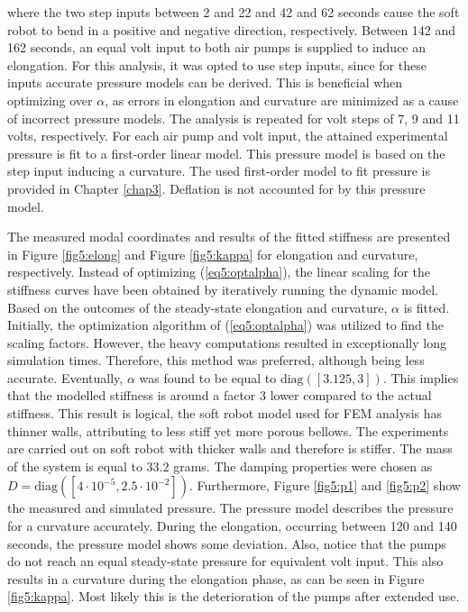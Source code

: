 where the two step inputs between 2 and 22 and 42 and 62 seconds cause the soft robot to bend in a positive and negative direction, respectively. Between 142 and 162 seconds, an equal volt input to both air pumps is supplied to induce an elongation. For this analysis, it was opted to use step inputs, since for these inputs accurate pressure models can be derived. This is beneficial when optimizing over $\alpha$, as errors in elongation and curvature are minimized as a cause of incorrect pressure models. The analysis is repeated for volt steps of 7, 9 and 11 volts, respectively. For each air pump and volt input, the attained experimental pressure is fit to a first-order linear model. This pressure model is based on the step input inducing a curvature. The used first-order model to fit pressure is provided in Chapter \ref{chap3}. Deflation is not accounted for by this pressure model. 

The measured modal coordinates and results of the fitted stiffness are presented in Figure \ref{fig5:elong} and Figure \ref{fig5:kappa} for elongation and curvature, respectively. Instead of optimizing (\ref{eq5:optalpha}), the linear scaling for the stiffness curves have been obtained by iteratively running the dynamic model. Based on the outcomes of the steady-state elongation and curvature, $\alpha$ is fitted. Initially, the optimization algorithm of (\ref{eq5:optalpha}) was utilized to find the scaling factors. However, the heavy computations resulted in exceptionally long simulation times. Therefore, this method was preferred, although being less accurate. Eventually, $\alpha$ was found to be equal to $\text{diag}([3.125,3])$. This implies that the modelled stiffness is around a factor 3 lower compared to the actual stiffness. This result is logical, the soft robot model used for FEM analysis has thinner walls, attributing to less stiff yet more porous bellows. The experiments are carried out on soft robot with thicker walls and therefore is stiffer. The mass of the system is equal to $33.2$ grams. The damping properties were chosen as $D = \text{diag}([4\cdot 10^{-5},2.5\cdot 10^{-2}])$. Furthermore, Figure \ref{fig5:p1} and \ref{fig5:p2} show the measured and simulated pressure. The pressure model describes the pressure for a curvature accurately. During the elongation, occurring between 120 and 140 seconds, the pressure model shows some deviation. Also, notice that the pumps do not reach an equal steady-state pressure for equivalent volt input. This also results in a curvature during the elongation phase, as can be seen in Figure \ref{fig5:kappa}. Most likely this is the deterioration of the pumps after extended use. 

